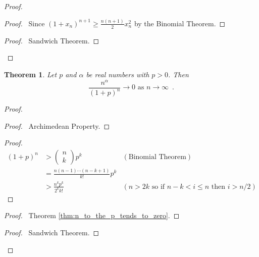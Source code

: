 \documentclass{book}
\let\qed\relax
\newtheorem{thm}[prop]{Theorem}
\theoremstyle{definition}
\begin{document}
\begin{proof}
\pf
{}
\begin{proof}
	\pf\ Since $(1+x_n)^{n+1} \geq \frac{n(n+1)}{2} x_n^2$ by the Binomial Theorem.
\end{proof}
\begin{proof}
	\pf\ Sandwich Theorem.
\end{proof}
\qed
\end{proof}

\begin{thm}
Let $p$ and $\alpha$ be real numbers with $p > 0$. Then
\[ \frac{n^\alpha}{(1+p)^n} \rightarrow 0 \text{ as } n \rightarrow \infty \enspace . \]
\end{thm}

\begin{proof}
\pf
{}
\begin{proof}
	\pf\ Archimedean Property.
\end{proof}
\begin{proof}
	\begin{align*}
		(1+p)^n & > \left( \begin{array}{c} n \\ k \end{array} \right) p^k & (\text{Binomial Theorem}) \\
		& = \frac{n(n-1) \cdots (n-k+1)}{k!} p^k \\
		& > \frac{n^k p^k}{2^k k!} & (n > 2k \text{ so if } n-k < i \leq n \text{ then } i > n/2)
	\end{align*}
\end{proof}
\begin{proof}
	\pf\ Theorem \ref{thm:n_to_the_p_tends_to_zero}.
\end{proof}
\begin{proof}
	\pf\ Sandwich Theorem.
\end{proof}
\qed
\end{proof}
\end{document}
